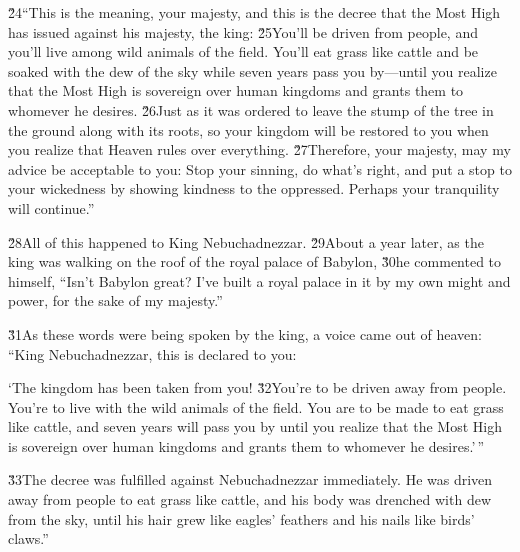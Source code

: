\v{24}``This is the meaning, your majesty, and this is the decree that the Most High has issued against his majesty, the king: \v{25}You'll be driven from people, and you'll live among wild animals of the field. You'll eat grass like cattle and be soaked with the dew of the sky while seven years pass you by---until you realize that the Most High is sovereign over human kingdoms and grants them to whomever he desires. \v{26}Just as it was ordered to leave the stump of the tree in the ground along with its roots, so your kingdom will be restored to you when you realize that Heaven rules over everything. \v{27}Therefore, your majesty, may my advice be acceptable to you: Stop your sinning, do what's right, and put a stop to your wickedness by showing kindness to the oppressed. Perhaps your tranquility will continue.''

\v{28}All of this happened to King Nebuchadnezzar. \v{29}About a year later, as the king was walking on the roof of the royal palace of Babylon, \v{30}he commented to himself, ``Isn't Babylon great? I've built a royal palace in it by my own might and power, for the sake of my majesty.''

\v{31}As these words were being spoken by the king, a voice came out of heaven: ``King Nebuchadnezzar, this is declared to you:

\begin{poetry}
\poeml `The kingdom has been taken from you! \v{32}You're to be driven away from people. You're to live with the wild animals of the field. You are to be made to eat grass like cattle, and seven years will pass you by until you realize that the Most High is sovereign over human kingdoms and grants them to whomever he desires.'\,''
\end{poetry}

\v{33}The decree was fulfilled against Nebuchadnezzar immediately. He was driven away from people to eat grass like cattle, and his body was drenched with dew from the sky, until his hair grew like eagles' feathers and his nails like birds' claws.''

